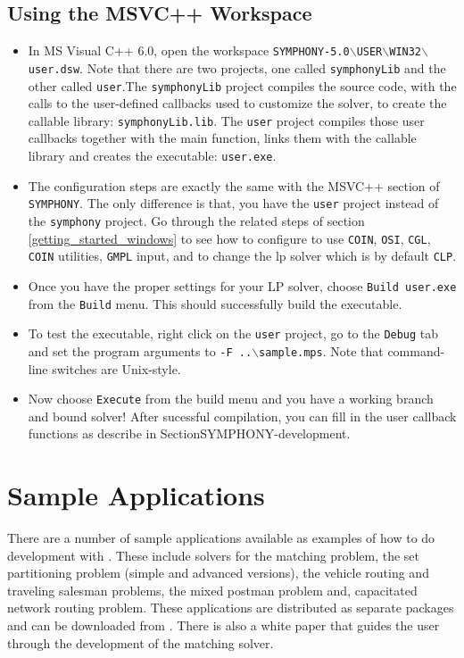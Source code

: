 \subsection{Using the MSVC++ Workspace}

\begin{itemize}
\item
In MS Visual C++ 6.0, open the workspace 
\texttt{SYMPHONY-5.0$\backslash$USER$\backslash$WIN32$\backslash$user.dsw}.
Note that there are two projects, one called \texttt{symphonyLib} and the other 
called \texttt{user}.The \texttt{symphonyLib} project compiles the source code, with the 
calls to the user-defined callbacks used to customize the solver, to create 
the callable library: \texttt{symphonyLib.lib}. The \texttt{user} 
project compiles those user callbacks together with the main function, links 
them with the callable library and creates the executable: \texttt{user.exe}.

\item 
The configuration steps are exactly the same with the MSVC++ section of 
\texttt{SYMPHONY}. The only 
difference is that, you have the \texttt{user} project instead of the
\texttt{symphony} project. Go through the related steps of section 
\ref{getting_started_windows} to see how to configure to use 
\texttt{COIN}, \texttt{OSI}, \texttt{CGL}, \texttt{COIN} utilities, 
\texttt{GMPL} input, and to change the lp solver which is by default 
\texttt{CLP}.

\item
Once you have the proper settings for your LP solver, choose \texttt{Build
user.exe} from the \texttt{Build} menu. This should successfully 
build the executable.

\item
To test the executable, right click on the \texttt{user} project, go to the
\texttt{Debug} tab and set the program arguments to 
\texttt{-F ..$\backslash$sample.mps}. Note that command-line switches are 
Unix-style.

\item
Now choose \texttt{Execute} from the build menu and you have a working branch
and bound solver! After sucessful compilation, you can fill in the user
callback functions as describe in Section{SYMPHONY-development}.
\end{itemize}

\section{Sample Applications}

There are a number of sample applications available as examples of how to do
development with \BB. These include solvers for the matching problem, the set
partitioning problem (simple and advanced versions), the vehicle routing and
traveling salesman problems, the mixed postman problem and, capacitated
network routing problem. These applications are distributed as separate
packages and can be downloaded from
\texttt{}. There is also a white paper that guides the
user through the development of the matching solver.
